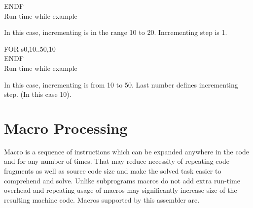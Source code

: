 {\begin{code}[h!]
                            { \color{highlight_directive}  ENDF}\\
                        \caption{Run time while example}
                    \end{code}
            In this case, incrementing is in the range 10 to 20. Incrementing step is 1.
                    \begin{code}[h!]
                            { \color{highlight_directive} FOR  }
                            { \color{highlight_constant}   s0,10..50,10 }\\
                            { \color{highlight_directive}  ENDF}\\
                        \caption{Run time while example}
                    \end{code}
            In this case, incrementing is from 10 to 50. Last number defines incrementing step. (In this case 10).

    \section{Macro Processing}
        Macro is a sequence of instructions which can be expanded anywhere in the code and for any number of times. That may reduce necessity of
        repeating code fragments as well as source code size and make the solved task easier to comprehend and solve. Unlike subprograms macros do
        not add extra run-time overhead and repeating usage of macros may significantly increase size of the resulting machine code. Macros supported
        by this assembler are.

}
